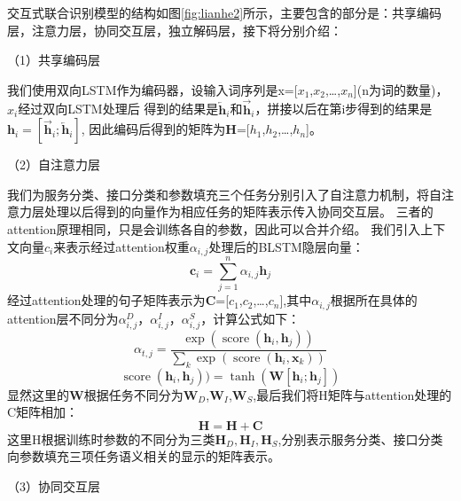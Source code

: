 交互式联合识别模型的结构如图\ref{fig:lianhe2}所示，主要包含的部分是：共享编码层，注意力层，协同交互层，独立解码层，接下将分别介绍：

（1）共享编码层

我们使用双向LSTM作为编码器，设输入词序列是x=[$x_{1}$,$x_{2}$,\dots,$x_{n}$](n为词的数量)，$x_{i}$经过双向LSTM处理后
得到的结果是$\overleftarrow{\mathbf{h}}_{i}$和$\overrightarrow{\mathbf{h}}_{i}$，拼接以后在第i步得到的结果是$\mathbf{h}_{i}=[\overrightarrow{\mathbf{h}}_{i} ;\overleftarrow{\mathbf{h}}_{i}]$,
因此编码后得到的矩阵为$\mathbf{H}$=[$h_{1}$,$h_{2}$,\dots,$h_{n}$]。

（2）自注意力层

我们为服务分类、接口分类和参数填充三个任务分别引入了自注意力机制，将自注意力层处理以后得到的向量作为相应任务的矩阵表示传入协同交互层。
三者的attention原理相同，只是会训练各自的参数，因此可以合并介绍。
我们引入上下文向量${c}_{i}$来表示经过attention权重$\alpha_{i,j}$处理后的BLSTM隐层向量：
\begin{equation}
    \mathbf{c}_{i}=\sum_{j=1}^{n} \alpha_{i, j} \mathbf{h}_{j}
  \end{equation}
  经过attention处理的句子矩阵表示为$\mathbf{C}$=[$c_{1}$,$c_{2}$,\dots,$c_{n}$],其中$\alpha_{i, j}$根据所在具体的attention层不同分为$\alpha_{i, j}^{D}$，$\alpha_{i, j}^{I}$，$\alpha_{i, j}^{S}$，计算公式如下：
  \begin{equation}
    \alpha_{t, j}=\frac{\exp \left(\operatorname{score}\left(\mathbf{h}_{i}, \mathbf{h}_{j}\right)\right)}{\sum_{k} \exp \left(\operatorname{score}\left(\mathbf{h}_{i}, \mathbf{x}_{k}\right)\right)}
    \end{equation}
    \begin{equation}
      \operatorname{score}(\mathbf{h}_{i}, \mathbf{h}_{j}))=\tanh \left(\mathbf{W}\left[\mathbf{h}_{i} ; \mathbf{h}_{j}\right]\right)
    \end{equation}
显然这里的$\mathbf{W}$根据任务不同分为$\mathbf{W}_D$,$\mathbf{W}_I$,$\mathbf{W}_S$,最后我们将H矩阵与attention处理的C矩阵相加：
\begin{equation}
  \mathbf{H}=\mathbf{H}+\mathbf{C}
\end{equation}
这里H根据训练时参数的不同分为三类$\mathbf{H}_{D},\mathbf{H}_{I},\mathbf{H}_{S}$,分别表示服务分类、接口分类向参数填充三项任务语义相关的显示的矩阵表示。

（3）协同交互层

